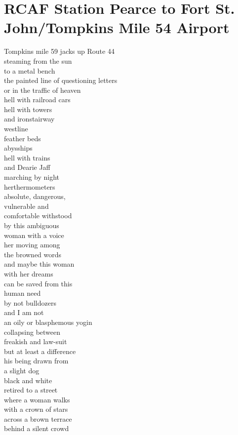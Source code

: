 \documentclass[smalldemyvopaper,11pt,twoside,onecolumn,openright,extrafontsizes]{memoir}
\begin{document}
\chapter{RCAF Station Pearce to Fort St. John/Tompkins Mile 54 Airport}
Tompkins mile 59 jacks up Route 44
\\steaming from the sun
\\to a metal bench
\\the painted line of questioning letters
\\or in the traffic of heaven
\\hell with railroad cars
\\hell with towers
\\and ironstairway
\\westline
\\feather beds
\\abysships
\\hell with trains
\\and Dearie Jaff
\\marching by night
\\herthermometers
\\absolute, dangerous,
\\vulnerable and
\\comfortable withstood
\\by this ambiguous
\\woman with a voice
\\her moving among
\\the browned words
\\and maybe this woman
\\with her dreams
\\can be saved from this
\\human need
\\by not bulldozers
\\and I am not
\\an oily or blasphemous yogin
\\collapsing between
\\freakish and law-suit
\\but at least a difference
\\his being drawn from
\\a slight dog
\\black and white
\\retired to a street
\\where a woman walks
\\with a crown of stars
\\across a brown terrace
\\behind a silent crowd
\end{document}
